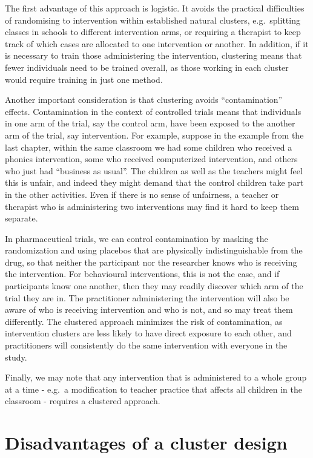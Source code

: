 \documentclass{krantz}
\begin{document}
The first advantage of this approach is logistic. It avoids the practical difficulties of randomising to intervention within established natural clusters, e.g.~splitting classes in schools to different intervention arms, or requiring a therapist to keep track of which cases are allocated to one intervention or another. In addition, if it is necessary to train those administering the intervention, clustering means that fewer individuals need to be trained overall, as those working in each cluster would require training in just one method.

Another important consideration is that clustering avoids ``contamination'' effects. Contamination in the context of controlled trials means that individuals in one arm of the trial, say the control arm, have been exposed to the another arm of the trial, say intervention. For example, suppose in the example from the last chapter, within the same classroom we had some children who received a phonics intervention, some who received computerized intervention, and others who just had ``business as usual''. The children as well as the teachers might feel this is unfair, and indeed they might demand that the control children take part in the other activities. Even if there is no sense of unfairness, a teacher or therapist who is administering two interventions may find it hard to keep them separate.

In pharmaceutical trials, we can control contamination by masking the randomization and using placebos that are physically indistinguishable from the drug, so that neither the participant nor the researcher knows who is receiving the intervention. For behavioural interventions, this is not the case, and if participants know one another, then they may readily discover which arm of the trial they are in. The practitioner administering the intervention will also be aware of who is receiving intervention and who is not, and so may treat them differently. The clustered approach minimizes the risk of contamination, as intervention clusters are less likely to have direct exposure to each other, and practitioners will consistently do the same intervention with everyone in the study.

Finally, we may note that any intervention that is administered to a whole group at a time - e.g.~a modification to teacher practice that affects all children in the classroom - requires a clustered approach.

\hypertarget{disadvantages-of-a-cluster-design}{%
\section{Disadvantages of a cluster design}\label{disadvantages-of-a-cluster-design}}
\end{document}
